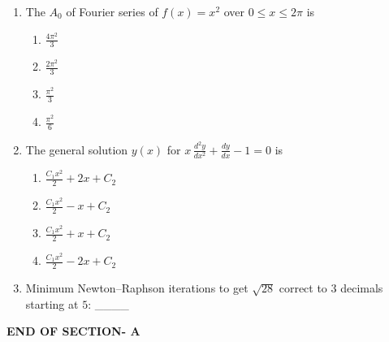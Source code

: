 \documentclass[journal,12pt,onecolumn]{IEEEtran}
\begin{document}
\begin{enumerate}[label=\arabic*)]
\vspace{0.5cm}

\item The $A_0$ of Fourier series of $f(x)=x^2$ over $0 \le x \le 2\pi$ is  
\hfill{} \\

\vspace{0.2cm}
\begin{enumerate}[label=\alph*)]
\item $\frac{4\pi^2}{3}$
\item $\frac{2\pi^2}{3}$
\item $\frac{\pi^2}{3}$
\item $\frac{\pi^2}{6}$
\end{enumerate}

\vspace{0.5cm}

\item The general solution $y(x)$ for  
$x\,\frac{d^2y}{dx^2} + \frac{dy}{dx} - 1 = 0$
is  
\hfill{} \\

\vspace{0.2cm}
\begin{enumerate}[label=\alph*)]
\item $\frac{C_1x^2}{2} + 2x + C_2$
\vspace{0.1cm}
\item $\frac{C_1x^2}{2} - x + C_2$
\vspace{0.1cm}
\item $\frac{C_1x^2}{2} + x + C_2$
\vspace{0.1cm}
\item $\frac{C_1x^2}{2} - 2x + C_2$
\end{enumerate}

\vspace{0.5cm}

\item Minimum Newton–Raphson iterations to get $\sqrt{28}$ correct to $3$ decimals starting at $5$: \_\_\_\_
\hfill{} \\

\end{enumerate}

\vspace{3\baselineskip}
\begin{center}
    \item[\textbf{END OF SECTION- A}]
\end{center}
\end{document}
